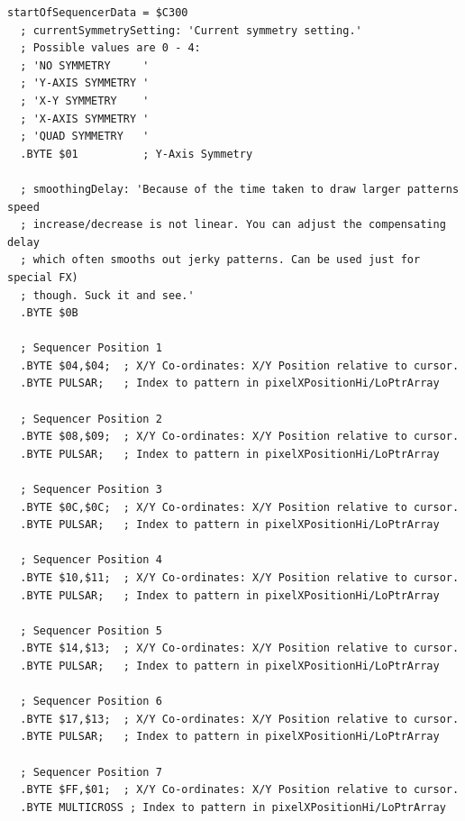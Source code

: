 \begin{lstlisting}[basicstyle=\ttfamily\scriptsize,caption=Sequencer definition in \icode{sequencer\_data.asm}.]
startOfSequencerData = $C300
  ; currentSymmetrySetting: 'Current symmetry setting.'                     
  ; Possible values are 0 - 4:                                              
  ; 'NO SYMMETRY     '                                                      
  ; 'Y-AXIS SYMMETRY '                                                      
  ; 'X-Y SYMMETRY    '                                                      
  ; 'X-AXIS SYMMETRY '                                                      
  ; 'QUAD SYMMETRY   '                                                      
  .BYTE $01          ; Y-Axis Symmetry

  ; smoothingDelay: 'Because of the time taken to draw larger patterns speed
  ; increase/decrease is not linear. You can adjust the compensating delay
  ; which often smooths out jerky patterns. Can be used just for special FX)
  ; though. Suck it and see.'                                               
  .BYTE $0B

  ; Sequencer Position 1
  .BYTE $04,$04;  ; X/Y Co-ordinates: X/Y Position relative to cursor.   
  .BYTE PULSAR;   ; Index to pattern in pixelXPositionHi/LoPtrArray   

  ; Sequencer Position 2
  .BYTE $08,$09;  ; X/Y Co-ordinates: X/Y Position relative to cursor.   
  .BYTE PULSAR;   ; Index to pattern in pixelXPositionHi/LoPtrArray   

  ; Sequencer Position 3
  .BYTE $0C,$0C;  ; X/Y Co-ordinates: X/Y Position relative to cursor.   
  .BYTE PULSAR;   ; Index to pattern in pixelXPositionHi/LoPtrArray   

  ; Sequencer Position 4
  .BYTE $10,$11;  ; X/Y Co-ordinates: X/Y Position relative to cursor.   
  .BYTE PULSAR;   ; Index to pattern in pixelXPositionHi/LoPtrArray   

  ; Sequencer Position 5
  .BYTE $14,$13;  ; X/Y Co-ordinates: X/Y Position relative to cursor.   
  .BYTE PULSAR;   ; Index to pattern in pixelXPositionHi/LoPtrArray   

  ; Sequencer Position 6
  .BYTE $17,$13;  ; X/Y Co-ordinates: X/Y Position relative to cursor.   
  .BYTE PULSAR;   ; Index to pattern in pixelXPositionHi/LoPtrArray   

  ; Sequencer Position 7
  .BYTE $FF,$01;  ; X/Y Co-ordinates: X/Y Position relative to cursor.   
  .BYTE MULTICROSS ; Index to pattern in pixelXPositionHi/LoPtrArray   


\end{lstlisting}
